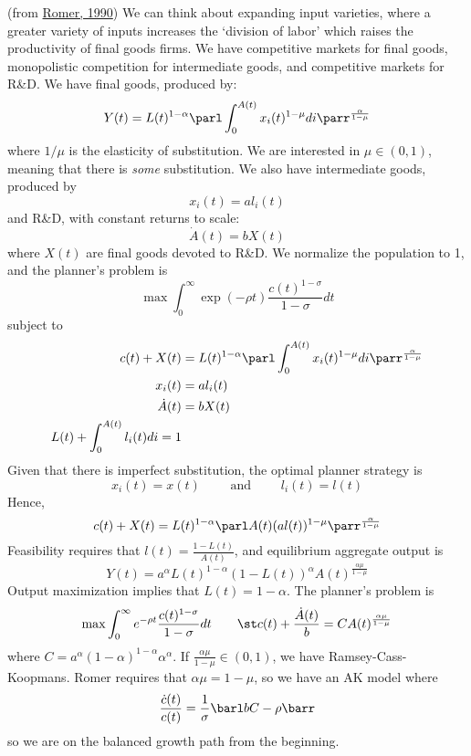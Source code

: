 \documentclass[10pt]{article}
\begin{document}
\begin{model}
	 (from \href{https://web.stanford.edu/~klenow/Romer_1990.pdf}{Romer, 1990}) We can think about expanding input varieties, where a greater variety of inputs increases the `division of labor' which raises the productivity of final goods firms. We have competitive markets for final goods, monopolistic competition for intermediate goods, and competitive markets for R\&D. We have final goods, produced by:\[Y(t) = L(t)^{1-\alpha} \parl \int_0^{A(t)}x_i(t)^{1-\mu}di\parr^{\frac{\alpha}{1-\mu}}\]where $1/\mu$ is the elasticity of substitution. We are interested in $\mu \in (0,1)$, meaning that there is \emph{some} substitution. We also have intermediate goods, produced by\[x_i(t) = al_i(t)\]and R\&D, with constant returns to scale:\[\dot{A}(t) = bX(t)\]where $X(t)$ are final goods devoted to R\&D. We normalize the population to 1, and the planner's problem is
	\[\max \int_0^\infty \exp(-\rho t) \frac{c(t)^{1-\sigma}}{1-\sigma} dt\]subject to \begin{align*}
		c(t) + X(t) &= L(t)^{1-\alpha} \parl \int_0^{A(t)}x_i(t)^{1-\mu}di\parr^{\frac{\alpha}{1-\mu}}\\
		x_i(t) &= al_i(t)\\
		\dot{A}(t) &= bX(t) \\
		L(t) + \int_0^{A(t)}l_i(t)di = 1
	\end{align*}
	Given that there is imperfect substitution, the optimal planner strategy is \[x_i(t) = x(t) \qquad \text{ and } \qquad l_i(t) = l(t)\]Hence,\[c(t) + X(t) = L(t)^{1-\alpha} \parl A(t)(al(t))^{1-\mu}\parr^{\frac{\alpha}{1-\mu}}\]Feasibility requires that $l(t) = \frac{1-L(t)}{A(t)}$, and equilibrium aggregate output is \[Y(t) = a^\alpha L(t)^{1-\alpha} (1-L(t))^\alpha A(t)^{\frac{\alpha\mu}{1-\mu}}\]Output maximization implies that $L(t) = 1-\alpha$. The planner's problem is \[\max \int_0^\infty e^{-\rho t} \frac{c(t)^{1-\sigma}}{1-\sigma}dt  \qquad \st c(t)+\frac{\dot{A}(t)}{b} = CA(t)^{\frac{\alpha\mu}{1-\mu}}\]where $C = a^\alpha (1-\alpha)^{1-\alpha}\alpha^\alpha$. If $\frac{\alpha\mu}{1-\mu} \in (0,1)$, we have Ramsey-Cass-Koopmans. Romer requires that $\alpha\mu = 1-\mu$, so we have an AK model where \[\frac{\dot{c}(t)}{c(t)} = \frac{1}{\sigma}\barl bC - \rho\barr\]so we are on the balanced growth path from the beginning. 
	

\end{model}
\end{document}
